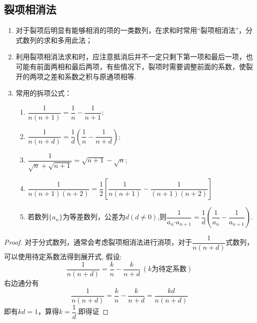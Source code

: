 \documentclass{BHCexam}
\begin{document}
\subsection{裂项相消法}
\begin{enumerate}
\item 对于裂项后明显有能够相消的项的一类数列，在求和时常用“裂项相消法”，分式数列的求和多用此法；
\item 利用裂项相消法求和时，应注意抵消后并不一定只剩下第一项和最后一项，也可能有前面两相和最后两项，有些情况下，裂项时需要调整前面的系数，使裂开的两项之差和系数之积与原通项相等.
\item 常用的拆项公式：\begin{enumerate}
\item $ \dfrac{1}{n(n+1)}=\dfrac{1}{n}-\dfrac{1}{n+1}; $
\item $ \dfrac{1}{n(n+d)}=\dfrac{1}{d}\left(\dfrac{1}{n}-\dfrac{1}{n+d}\right) $;
\item $\dfrac{1}{\sqrt{n}+\sqrt{n+1}}=\sqrt{n+1}-\sqrt{n}$;
\item $\dfrac{1}{n(n+1)(n+2)}=\dfrac{1}{2}\left[\dfrac{1}{n(n+1)}-\dfrac{1}{(n+1)(n+2)}\right]$
\item 若数列$\{a_n\}$为等差数列，公差为$ d (d\ne0)$,则$ \dfrac{1}{a_n\bm{\cdot}a_{n+1}}=\dfrac{1}{d}\left(\dfrac{1}{a_n}-\dfrac{1}{a_{n+1}}\right). $
\end{enumerate}
\end{enumerate}
\begin{proof}
对于分式数列，通常会考虑裂项相消法进行消项，对于$ \dfrac{1}{n(n+d)} $式数列，可以使用待定系数法得到展开式,
假设:$$ \dfrac{1}{n(n+d)}=\dfrac{k}{n}-\dfrac{k}{n+d} ~(k\text{为待定系数})$$
右边通分有$$\dfrac{1}{n(n+d)}= \dfrac{k}{n}-\dfrac{k}{n+d}=\dfrac{kd}{n(n+d)} $$
即有$ kd=1 $，算得$ k=\dfrac{1}{d} $.即得证
\end{proof}
\end{document}
